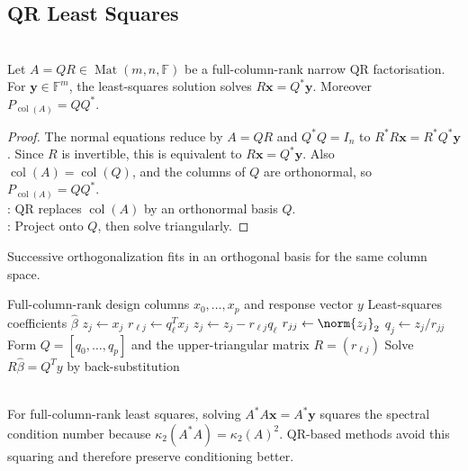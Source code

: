 \subsection{QR Least Squares}

\begin{proposition} \label{prop:qr-least-squares-and-projection} \\
Let $A=QR\in\operatorname{Mat}(m,n,\mathbb{F})$ be a full-column-rank narrow QR factorisation. For $\mathbf{y}\in\mathbb{F}^m$, the least-squares solution solves $R\mathbf{x}=Q^*\mathbf{y}$. Moreover $P_{\operatorname{col}(A)}=QQ^*$.
\begin{proof}
The normal equations reduce by $A=QR$ and $Q^*Q=I_n$ to $R^*R\mathbf{x}=R^*Q^*\mathbf{y}$.
Since $R$ is invertible, this is equivalent to $R\mathbf{x}=Q^*\mathbf{y}$. Also $\operatorname{col}(A)=\operatorname{col}(Q)$, and the columns of $Q$ are orthonormal, so $P_{\operatorname{col}(A)}=QQ^*$.\\
: QR replaces $\operatorname{col}(A)$ by an orthonormal basis $Q$.\\
: Project onto $Q$, then solve triangularly.
\end{proof}
\end{proposition}

Successive orthogonalization fits in an orthogonal basis for the same column space.

\begin{breakablealgorithm}
\caption{Least Squares by Successive Orthogonalization}
\label{alg:sl-successive-orthogonalization-least-squares}
\begin{algorithmic}
\Require Full-column-rank design columns $x_0,\ldots,x_p$ and response vector $y$
\Ensure Least-squares coefficients $\widehat{\beta}$
\State $z_j\gets x_j$
\State $r_{\ell j}\gets q_\ell^Tx_j$
\State $z_j\gets z_j-r_{\ell j}q_\ell$
\EndFor
\State $r_{jj}\gets \norm{z_j}_2$
\State $q_j\gets z_j/r_{jj}$
\EndFor
\State Form $Q=[q_0,\ldots,q_p]$ and the upper-triangular matrix $R=(r_{\ell j})$
\State Solve $R\widehat{\beta}=Q^Ty$ by back-substitution
\end{algorithmic}
\end{breakablealgorithm}

\begin{perspective} \label{per:normal-equations-squaring-condition-number} \\
For full-column-rank least squares, solving $A^*A\mathbf{x}=A^*\mathbf{y}$ squares the spectral condition number because $\kappa_2(A^*A)=\kappa_2(A)^2$. QR-based methods avoid this squaring and therefore preserve conditioning better.
\end{perspective}

